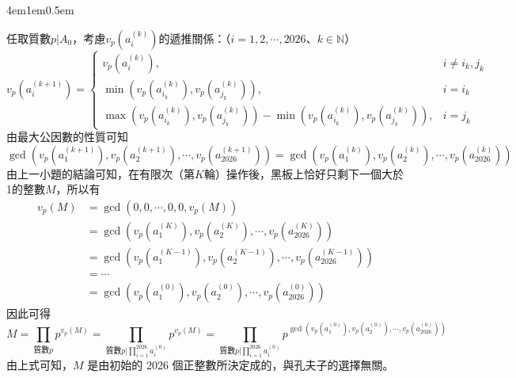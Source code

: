 \documentclass[12pt]{article}
\begin{document}
\begin{mybox}[解答]{4em}{1em}{0.5em}
\begin{enumerate}[label=(\arabic*)]
        任取質數$p|A_0$，考慮$v_p\left(a_i^{\left(k\right)}\right)$的遞推關係：（$i=1,2,\cdots,2026$、$k\in\mathbb{N}$）
        $$
            v_p\left(a_i^{\left(k+1\right)}\right)=\begin{cases}
                v_p\left(a_i^{\left(k\right)}\right),&i\neq i_k,j_k\\
                \min\left(v_p\left(a_{i_k}^{\left(k\right)}\right),v_p\left(a_{j_k}^{\left(k\right)}\right)\right),&i=i_k\\
                \max\left(v_p\left(a_{i_k}^{\left(k\right)}\right),v_p\left(a_{j_k}^{\left(k\right)}\right)\right)-\min\left(v_p\left(a_{i_k}^{\left(k\right)}\right),v_p\left(a_{j_k}^{\left(k\right)}\right)\right),&i=j_k
            \end{cases}
        $$
        由最大公因數的性質可知
        $$
            \gcd\left(v_p\left(a_1^{\left(k+1\right)}\right),v_p\left(a_2^{\left(k+1\right)}\right),\cdots,v_p\left(a_{2026}^{\left(k+1\right)}\right)\right)=\gcd\left(v_p\left(a_1^{\left(k\right)}\right),v_p\left(a_2^{\left(k\right)}\right),\cdots,v_p\left(a_{2026}^{\left(k\right)}\right)\right)
        $$
        由上一小題的結論可知，在有限次（第$K$輪）操作後，黑板上恰好只剩下一個大於1的整數$M$，所以有
        \begin{align*}
            v_p\left(M\right)&=\gcd\left(0,0,\cdots,0,0,v_p\left(M\right)\right)\\
            &=\gcd\left(v_p\left(a_1^{\left(K\right)}\right),v_p\left(a_2^{\left(K\right)}\right),\cdots,v_p\left(a_{2026}^{\left(K\right)}\right)\right)\\
            &=\gcd\left(v_p\left(a_1^{\left(K-1\right)}\right),v_p\left(a_2^{\left(K-1\right)}\right),\cdots,v_p\left(a_{2026}^{\left(K-1\right)}\right)\right)\\
            &=\cdots\\
            &=\gcd\left(v_p\left(a_1^{\left(0\right)}\right),v_p\left(a_2^{\left(0\right)}\right),\cdots,v_p\left(a_{2026}^{\left(0\right)}\right)\right)
        \end{align*}
        因此可得
        $$
            M=\prod\limits_{\text{質數}p}{p^{v_p\left(M\right)}}=\prod\limits_{\text{質數}p|\prod\limits_{i=1}^{2026}{a_i^{\left(0\right)}}}{p^{v_p\left(M\right)}}=\prod\limits_{\text{質數}p|\prod\limits_{i=1}^{2026}{a_i^{\left(0\right)}}}p^{\gcd\left(v_p\left(a_1^{\left(0\right)}\right),v_p\left(a_2^{\left(0\right)}\right),\cdots,v_p\left(a_{2026}^{\left(0\right)}\right)\right)}
        $$
        由上式可知，$M$ 是由初始的 2026 個正整數所決定成的，與孔夫子的選擇無關。
    \end{enumerate}
\end{mybox}
\end{document}
